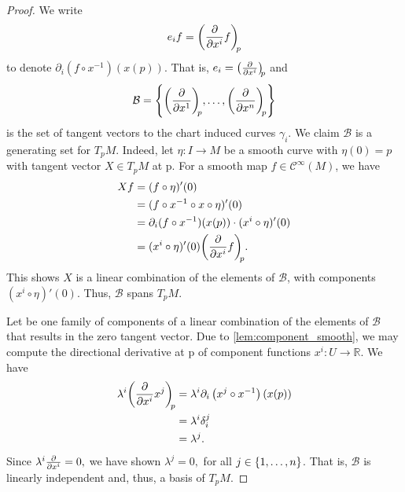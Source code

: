 \begin{proof}
    We write
    \begin{equation*}
        e_i f = \bvec[f]{x^i}{p}
    \end{equation*}
    to denote \(\partial_i (f\circ x^{-1})(x(p)).\) That is, \(e_i = \bvec{x^i}{p}\) and
    \begin{equation*}
        \mathcal{B} = \bset{x}{n}{p}%
    \end{equation*}
    is the set of tangent vectors to the chart induced curves \(\gamma_i\). We claim \(\mathcal{B}\) is a generating set for \(T_p M\). Indeed, let \(\eta : I \to M\) be a smooth curve with \(\eta(0) = p\) with tangent vector \(X\in T_pM\) at p. For a smooth map \(f \in \mathcal{C} ^\infty (M)\), we have
    \begin{align*}
        Xf &= (f \circ \eta)'(0)\\
           &= (f \circ x^{-1} \circ x \circ \eta)'(0)\\
           &= \partial_i (f \circ x^{-1})(x(p)) \cdot (x^i \circ \eta)'(0)\\
           &= (x^i \circ \eta)'(0) \bvec[f]{x^i}{p}.
    \end{align*}
    This shows \(X\) is a linear combination of the elements of \(\mathcal{B}\), with components \((x^i \circ \eta)'(0).\) Thus, \(\mathcal{B}\) spans \(T_pM\).

    Let  be one family of components of a linear combination of the elements of \(\mathcal{B}\) that results in the zero tangent vector. Due to \cref{lem:component_smooth}, we may compute the directional derivative at p of component functions \(x^i : U \to \mathbb{R}\). We have
    \begin{align*}
        \lambda^i \bvec[x^j]{x^i}{p} &= \lambda^i \partial_i \left(x^j \circ x^{-1}\right)(x(p))\\
                                     &= \lambda^i \delta_{i}^j\\
                                     &= \lambda^j.
    \end{align*}
    Since \(\lambda^i \diffp*{}{x^i} = 0,\) we have shown \(\lambda^j = 0,\) for all \(j \in \{1, \dots, n\}\). That is, \(\mathcal{B}\) is linearly independent and, thus, a basis of \(T_pM\).
\end{proof}

